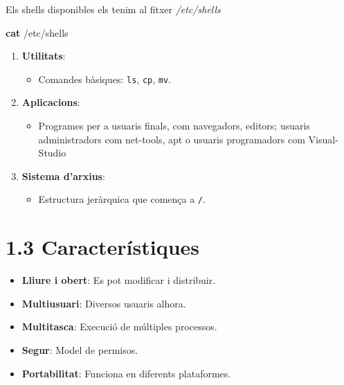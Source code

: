 \documentclass[
  catalan,
  a4paper,
]{article}
\newenvironment{Shaded}{\begin{snugshade}}{\end{snugshade}}
\newcommand{\FunctionTok}[1]{\textcolor[rgb]{0.13,0.29,0.53}{\textbf{#1}}}
\newcommand{\NormalTok}[1]{#1}
\providecommand{\tightlist}{%
  \setlength{\itemsep}{0pt}\setlength{\parskip}{0pt}}
\begin{document}
Els shells disponibles els tenim al fitxer \emph{/etc/shells}

\begin{Shaded}
\begin{Highlighting}[]
\FunctionTok{cat}\NormalTok{ /etc/shells}
\end{Highlighting}
\end{Shaded}

\begin{enumerate}
\def\labelenumi{\arabic{enumi}.}
\setcounter{enumi}{2}
\tightlist
\item
  \textbf{Utilitats}:

  \begin{itemize}
  \tightlist
  \item
    Comandes bàsiques: \texttt{ls}, \texttt{cp}, \texttt{mv}.
  \end{itemize}
\item
  \textbf{Aplicacions}:

  \begin{itemize}
  \tightlist
  \item
    Programes per a usuaris finals, com navegadors, editors; usuaris
    administradors com net-tools, apt o usuaris programadors com
    Visual-Studio
  \end{itemize}
\item
  \textbf{Sistema d'arxius}:

  \begin{itemize}
  \tightlist
  \item
    Estructura jeràrquica que comença a \texttt{/}.
  \end{itemize}
\end{enumerate}

\section{1.3 Característiques}\label{caracteruxedstiques}

\begin{itemize}
\tightlist
\item
  \textbf{Lliure i obert}: Es pot modificar i distribuir.
\item
  \textbf{Multiusuari}: Diversos usuaris alhora.
\item
  \textbf{Multitasca}: Execució de múltiples processos.
\item
  \textbf{Segur}: Model de permisos.
\item
  \textbf{Portabilitat}: Funciona en diferents plataformes.
\end{itemize}
\end{document}
